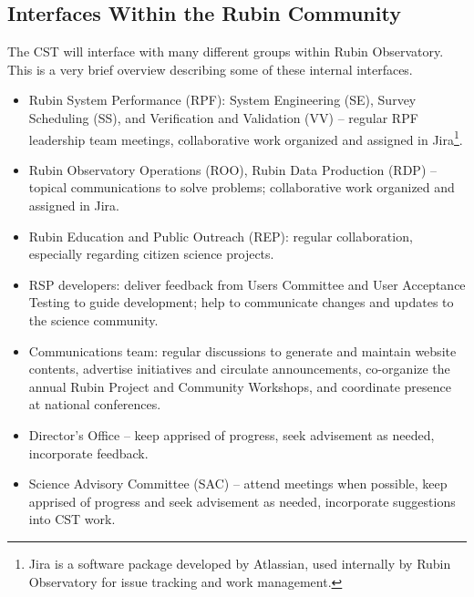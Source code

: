 \documentclass[DM,authoryear,toc]{lsstdoc}
\begin{document}
\subsection{Interfaces Within the Rubin Community}\label{ssec:mod_interface}

The CST will interface with many different groups within Rubin Observatory. 
This is a very brief overview describing some of these internal interfaces.
\begin{itemize}
\item Rubin System Performance (RPF): System Engineering (SE), Survey Scheduling (SS), and Verification and Validation (VV) -- regular RPF leadership team meetings, collaborative work organized and assigned in Jira\footnote{Jira is a software package developed by Atlassian, used internally by Rubin Observatory for issue tracking and work management.}.
\item Rubin Observatory Operations (ROO), Rubin Data Production (RDP) -- topical communications to solve problems; collaborative work organized and assigned in Jira.
\item Rubin Education and Public Outreach (REP): regular collaboration, especially regarding citizen science projects.
\item RSP developers: deliver feedback from Users Committee and User Acceptance Testing to guide development; help to communicate changes and updates to the science community.
\item Communications team: regular discussions to generate and maintain website contents, advertise initiatives and circulate announcements, co-organize the annual Rubin Project and Community Workshops, and coordinate presence at national conferences.
\item Director's Office -- keep apprised of progress, seek advisement as needed, incorporate feedback.
\item Science Advisory Committee (SAC) -- attend meetings when possible, keep apprised of progress and seek advisement as needed, incorporate suggestions into CST work.
\end{itemize}
\end{document}
